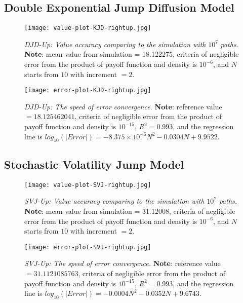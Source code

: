 \subsection{Double Exponential Jump Diffusion Model}
\begin{figure}[H]
    \centering
    \texttt{[image: value-plot-KJD-rightup.jpg]}
     \caption[\emph{DJD-Up: Value accuracy comparing to the simulation with} $10^7$ \emph{paths.}]{\emph{DJD-Up: Value accuracy comparing to the simulation with} $10^7$ \emph{paths.} \textbf{Note}: mean value from simulation = 18.122275, criteria of negligible error from the product of payoff function and density is $10^{-6}$, and $N$ starts from $10$  with increment $=2$.}

    \label{fig:label}
\end{figure}

\begin{figure}[H]
    \centering
    \texttt{[image: error-plot-KJD-rightup.jpg]}
    \caption[\emph{DJD-Up: The speed of error convergence.}]{\emph{DJD-Up: The speed of error convergence.} \textbf{Note}: reference value $=18.125462041$, criteria of negligible error from the product of payoff function and density is $10^{-15}$, $R^2=0.993$, and the regression line is $log_{10}\left(|Error|\right) = -8.375\times 10^{-6}N^2-0.0304N+9.9522$.}

    \label{fig:label}
\end{figure}


\subsection{Stochastic Volatility Jump Model}
\begin{figure}[H]
    \centering
    \texttt{[image: value-plot-SVJ-rightup.jpg]}
    \caption[\emph{SVJ-Up: Value accuracy comparing to the simulation with} $10^7$ \emph{paths.}]{\emph{SVJ-Up: Value accuracy comparing to the simulation with} $10^7$ \emph{paths.} \textbf{Note}: mean value from simulation = 31.12008, criteria of negligible error from the product of payoff function and density is $10^{-6}$, and $N$ starts from $10$  with increment $=2$.}

    \label{fig:label}
\end{figure}
\begin{figure}[H]
    \centering
    \texttt{[image: error-plot-SVJ-rightup.jpg]}
    \caption[\emph{SVJ-Up: The speed of error convergence.}]{\emph{SVJ-Up: The speed of error convergence.} \textbf{Note}: reference value $=31.1121085763$, criteria of negligible error from the product of payoff function and density is $10^{-15}$, $R^2=0.993$, and the regression line is $log_{10}\left(|Error|\right) = -0.0004N^2-0.0352N+9.6743$.}
    
    \label{fig:label}
\end{figure}


